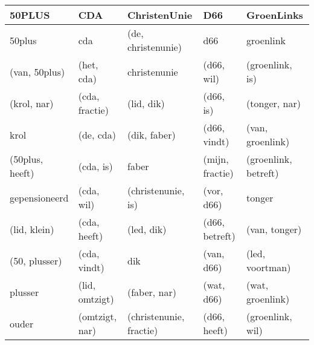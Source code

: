 \begin{tabular}{lllll}
\toprule
          50PLUS &             CDA &             ChristenUnie &              D66 &            GroenLinks \\
\midrule
          50plus &             cda &       (de, christenunie) &              d66 &             groenlink \\
   (van, 50plus) &      (het, cda) &             christenunie &       (d66, wil) &       (groenlink, is) \\
     (krol, nar) &  (cda, fractie) &               (lid, dik) &        (d66, is) &         (tonger, nar) \\
            krol &       (de, cda) &             (dik, faber) &     (d66, vindt) &      (van, groenlink) \\
 (50plus, heeft) &       (cda, is) &                    faber &  (mijn, fractie) &  (groenlink, betreft) \\
   gepensioneerd &      (cda, wil) &       (christenunie, is) &       (vor, d66) &                tonger \\
    (lid, klein) &    (cda, heeft) &               (led, dik) &   (d66, betreft) &         (van, tonger) \\
   (50, plusser) &    (cda, vindt) &                      dik &       (van, d66) &       (led, voortman) \\
         plusser &  (lid, omtzigt) &             (faber, nar) &       (wat, d66) &      (wat, groenlink) \\
           ouder &  (omtzigt, nar) &  (christenunie, fractie) &     (d66, heeft) &      (groenlink, wil) \\
\bottomrule
\end{tabular}
